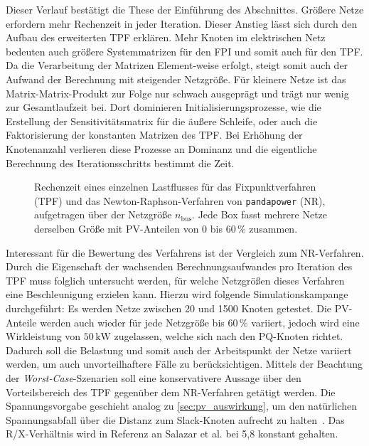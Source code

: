 Dieser Verlauf bestätigt die These der Einführung des Abschnittes.
Größere Netze erfordern mehr Rechenzeit in jeder Iteration.
Dieser Anstieg lässt sich durch den Aufbau des erweiterten TPF erklären.
Mehr Knoten im elektrischen Netz bedeuten auch größere Systemmatrizen für den FPI und somit auch für den TPF.
Da die Verarbeitung der Matrizen Element-weise erfolgt, steigt somit auch der Aufwand der Berechnung mit steigender Netzgröße.
Für kleinere Netze ist das Matrix-Matrix-Produkt zur Folge nur schwach ausgeprägt und trägt nur wenig zur Gesamtlaufzeit bei. 
Dort dominieren Initialisierungsprozesse, wie die Erstellung der Sensitivitätsmatrix für die äußere Schleife, oder auch die Faktorisierung der konstanten Matrizen des TPF.
Bei Erhöhung der Knotenanzahl verlieren diese Prozesse an Dominanz und die eigentliche Berechnung des Iterationsschritts bestimmt die Zeit.\\



\begin{figure}[htb]
	\centering
	
	\caption{Rechenzeit eines einzelnen Lastflusses für das Fixpunktverfahren
		(TPF) und das Newton-Raphson-Verfahren von \texttt{pandapower} (NR),
		aufgetragen über der Netzgröße $n_\mathrm{bus}$. Jede Box fasst mehrere Netze
		derselben Größe mit PV-Anteilen von $0$ bis $60\,\%$ zusammen.}
	\label{fig:size_analysis_time_per_iter}
\end{figure}

Interessant für die Bewertung des Verfahrens ist der Vergleich zum NR-Verfahren.
Durch die Eigenschaft der wachsenden Berechnungsaufwandes pro Iteration des TPF muss folglich untersucht werden, für welche Netzgrößen dieses Verfahren eine Beschleunigung erzielen kann. 
Hierzu wird folgende Simulationskampange durchgeführt: 
Es werden Netze zwischen 20 und 1500 Knoten getestet.  
Die PV-Anteile werden auch wieder für jede Netzgröße bis $60\,\%$ variiert, jedoch wird eine Wirkleistung von $50\,\mathrm{kW}$ zugelassen, welche sich nach den PQ-Knoten richtet.
Dadurch soll die Belastung und somit auch der Arbeitspunkt der Netze variiert werden, um auch unvorteilhaftere Fälle zu berücksichtigen.
Mittels der Beachtung der \emph{Worst-Case}-Szenarien soll eine konservativere Aussage über den Vorteilsbereich des TPF gegenüber dem NR-Verfahren getätigt werden.
Die Spannungsvorgabe geschieht analog zu \cref{sec:pv_auswirkung}, um den natürlichen Spannungsabfall über die Distanz zum Slack-Knoten aufrecht zu halten~\cite{E.LiuandJ.Bebic:GEGlobalResearch.}.
Das R/X-Verhältnis wird in Referenz an Salazar et al. bei 5,8 konstant gehalten.\\


